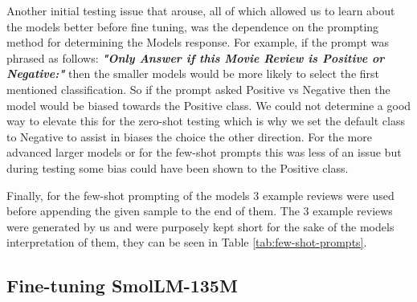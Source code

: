 \documentclass[10pt,twocolumn,letterpaper]{article}
\begin{document}
Another initial testing issue that arouse, all of which allowed us to learn about the models better before fine tuning, was the dependence on the prompting method for determining the Models response. For example, if the prompt was phrased as follows: \textit{\textbf{"Only Answer if this Movie Review is Positive or Negative:"}} then the smaller models would be more likely to select the first mentioned classification. So if the prompt asked Positive vs Negative then the model would be biased towards the Positive class. We could not determine a good way to elevate this for the zero-shot testing which is why we set the default class to Negative to assist in biases the choice the other direction. For the more advanced larger models or for the few-shot prompts this was less of an issue but during testing some bias could have been shown to the Positive class. 

Finally, for the few-shot prompting of the models 3 example reviews were used before appending the given sample to the end of them. The 3 example reviews were generated by us and were purposely kept short for the sake of the models interpretation of them, they can be seen in Table \ref{tab:few-shot-prompts}.

\begin{table}
\begin{center}
\end{center}
\caption{Few-shot prompts used to test default SmolLM models.}
\label{tab:few-shot-prompts}
\end{table}


\subsection{Fine-tuning SmolLM-135M}
\end{document}
